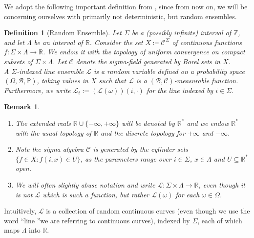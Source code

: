 \documentclass[12pt]{report}
\theoremstyle{plain}
\newtheorem*{remark}{Remark}
\newtheorem{definition}{Definition}[section]
\newcommand{\R}{\ensuremath{\mathbb{R}}}
\newcommand{\Z}{\ensuremath{\mathbb{Z}}}
\newcommand{\PP}{\ensuremath{\mathbb{P}}}
\begin{document}
We adopt the following important definition from \cite{corwin2014brownian}, since from now on, we will be concerning ourselves with primarily not deterministic, but random ensembles.

\begin{definition}[Random Ensemble]\label{def; random ensemble}
    Let $\Sigma$ be a (possibly infinite) interval of $\Z$, and let $\Lambda$ be an interval of $\R$. Consider the set \(X\coloneqq\mathcal{C}^\Sigma\) of continuous functions $f:\Sigma\times \Lambda \rightarrow \R$. We endow it with the topology of uniform convergence on compact subsets of $\Sigma\times\Lambda$. Let $\mathcal{C}$ denote the sigma-field  generated by Borel sets in $X$.\\

    A {\it $\Sigma$-indexed line ensemble} $\mathcal{L}$ is a random variable defined on a probability space $(\Omega,\mathcal{B},\PP)$, taking values in $X$ such that $\mathcal{L}$ is a $(\mathcal{B},\mathcal{C})$-measurable function. Furthermore, we write $\mathcal{L}_i:=(\mathcal{L}(\omega))(i,\cdot)$ for the line indexed by $i\in\Sigma$. 
\end{definition}%

\begin{remark}
\centering
\begin{enumerate}
    \item The extended reals $\R\cup\{-\infty,+\infty\}$ will be denoted by $\R^*$ and we endow $\R^*$ with the usual topology of $\R$ and the discrete topology for $+\infty$ and $-\infty$.
    \item Note the sigma algebra \(\mathcal{C}\) is generated by the cylinder sets $\{f\in X: f(i,x)\in U\}$, as the parameters range over $i\in \Sigma$, $x\in \Lambda$ and $U \subseteq \R^*$ open.
    \item We will often slightly abuse notation and write $\mathcal{L}:\Sigma\times \Lambda \rightarrow \R$, even though it is not $\mathcal{L}$ which is such a function, but rather $\mathcal{L}(\omega)$ for each $\omega \in \Omega$. 
\end{enumerate}
\end{remark}

Intuitively, $\mathcal{L}$ is a collection of random continuous curves (even though we use the word \textquotedblleft line \textquotedblright we are referring to continuous curves), indexed by $\Sigma$, each of which maps $\Lambda$ into $\R$.\\
\end{document}
